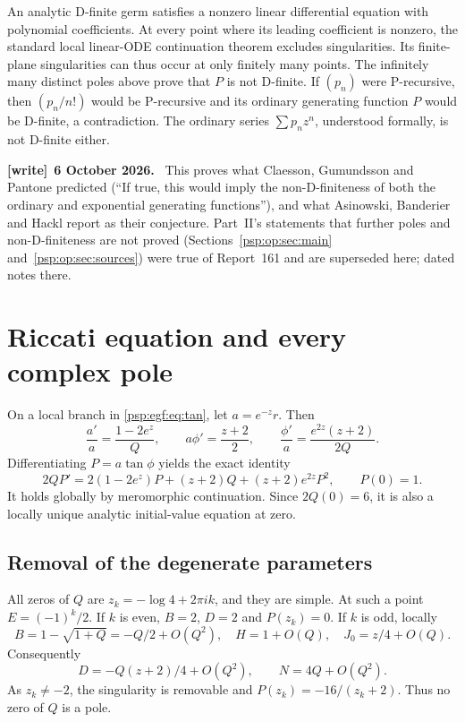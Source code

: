\documentclass[11pt,letterpaper]{article}
\numberwithin{equation}{section}
\theoremstyle{remark}\newtheorem{remark}[theorem]{Remark}
\newenvironment{writenote}[1][]{\par\smallskip\begingroup\small
 \noindent\textbf{[write]}\if\relax\detokenize{#1}\relax\else~\textbf{#1.}\fi\ }%
 {\par\endgroup\smallskip}
\begin{document}
An analytic D-finite germ satisfies a nonzero linear differential
equation with polynomial coefficients. At every point where its leading
coefficient is nonzero, the standard local linear-ODE continuation
theorem excludes singularities. Its finite-plane singularities can thus
occur at only finitely many points. The infinitely many distinct poles
above prove that $P$ is not D-finite. If $(p_n)$ were P-recursive, then
$(p_n/n!)$ would be P-recursive and its ordinary generating function $P$
would be D-finite, a contradiction. The ordinary series
$\sum p_nz^n$, understood formally, is not D-finite either.
\begin{writenote}[6 October 2026]
This proves what Claesson, Gu\dh mundsson and Pantone \cite[Section~3.3, p.~10]{cgp} predicted (``If true, this would imply the non-D-finiteness of both the ordinary and exponential generating functions''), and what Asinowski, Banderier and Hackl \cite[Section~2.4, p.~18]{abh} report as their conjecture. Part~II's statements that further poles and non-D-finiteness are not proved (Sections~\ref{psp:op:sec:main} and~\ref{psp:op:sec:sources}) were true of Report~161 and are superseded here; dated notes there.
\end{writenote}

\section{Riccati equation and every complex pole}\label{psp:egf:sec:riccati}
On a local branch in \eqref{psp:egf:eq:tan}, let $a=e^{-z}r$. Then
\[
 \frac{a'}a=\frac{1-2e^z}{Q},\qquad
 a\phi'=\frac{z+2}{2},\qquad
 \frac{\phi'}a=\frac{e^{2z}(z+2)}{2Q}.
\]
Differentiating $P=a\tan\phi$ yields the exact identity
\begin{equation}\label{psp:egf:eq:riccati}
 2Q P'=2(1-2e^z)P+(z+2)Q+(z+2)e^{2z}P^2,
 \qquad P(0)=1.
\end{equation}
It holds globally by meromorphic continuation. Since $2Q(0)=6$, it is
also a locally unique analytic initial-value equation at zero.

\subsection{Removal of the degenerate parameters}
All zeros of $Q$ are $z_k=-\log4+2\pi ik$, and they are simple. At such
a point $E=(-1)^k/2$. If $k$ is even, $B=2$, $D=2$ and $P(z_k)=0$.
If $k$ is odd, locally
\[
 B=1-\sqrt{1+Q}=-Q/2+O(Q^2),\quad H=1+O(Q),\quad
 J_0=z/4+O(Q).
\]
Consequently
\[
 D=-Q(z+2)/4+O(Q^2),\qquad N=4Q+O(Q^2).
\]
As $z_k\ne-2$, the singularity is removable and
$P(z_k)=-16/(z_k+2)$. Thus no zero of $Q$ is a pole.
\end{document}

